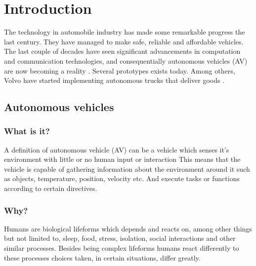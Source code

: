 \documentclass[conference]{IEEEtran}
\begin{document}

\begin{abstract}
\end{abstract}


%
\IEEEpeerreviewmaketitle

\section{Introduction}
 The technology in automobile industry has made some remarkable progress the last century. They have managed to
 make safe, reliable and affordable vehicles. The last couple of decades have seen significant advancements
 in computation and communication technologies, and consequentially autonomous vehicles (AV) are now becoming a reality \cite{IEEE:AutonomousCars}.
 Several prototypes exists today. Among others, Volvo have started implementing autonomous trucks that deliver goods \cite{Volvo2020}.
 \subsection{Autonomous vehicles}
	 \subsubsection{What is it?}
		 A definition of autonomous vehicle (AV) can be a vehicle which senses it's environment with little or no human input or interaction
		 This means that the vehicle is capable of gathering information about the environment around it such as objects, temperature, position, velocity etc. And
		 execute tasks or functions according to certain directives.
	 \subsubsection{Why?}
		 Humans are biological lifeforms which depends and reacts on, among other things but not limited to, sleep, food,
		 stress, isolation, social interactions and other similar processes. Besides being complex lifeforms
		 humans react differently to these processes choices taken, in certain situations, differ greatly.
\end{document}
